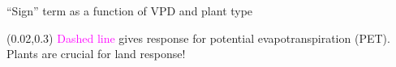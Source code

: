\documentclass[aspectratio=169]{beamer}
\begin{document}
\begin{frame}{``Sign'' term as a function of VPD and plant type}
  \begin{figure}
  \end{figure}
  \begin{textblock*}{0.25\textwidth}(0.02\textwidth,0.3\textheight)
    \textcolor{magenta}{Dashed line} gives response for potential evapotranspiration (PET).\\
    \medskip
    Plants are crucial for land response!
  \end{textblock*}
\end{frame}
\end{document}
